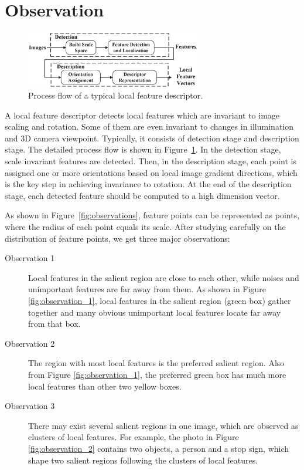 \section{Observation}
\label{sec:observation}

\begin{figure}
	\centering
	\includegraphics[width=3.0in]{images/fig-workflow.eps}
	\caption{Process flow of a typical local feature descriptor.}
	\label{fig:workflow}
\end{figure}

A local feature descriptor detects local features which are invariant to image scaling and rotation. Some of them are even invariant to changes in illumination and 3D camera viewpoint. Typically, it consists of detection stage and description stage. The detailed process flow is shown in Figure~\ref{fig:workflow}. In the detection stage, scale invariant features are detected. Then, in the description stage, each point is assigned one or more orientations based on local image gradient directions, which is the key step in achieving invariance to rotation. At the end of the description stage, each detected feature should be computed to a high dimension vector. 

As shown in Figure~\ref{fig:observations}, feature points can be represented as points, where the radius of each point equals its scale. After studying carefully on the distribution of feature points, we get three major observations:

\begin{description}
	
	\item[Observation 1]  Local features in the salient region are close to each other, while noises and unimportant features are far away from them. As shown in Figure \ref{fig:observation_1}, local features in the salient region (green box) gather together and many obvious unimportant local features locate far away from that box. 

	\item[Observation 2]  The region with most local features is the preferred salient region. Also from Figure \ref{fig:observation_1}, the preferred green box has much more local features than other two yellow boxes. 

	\item[Observation 3]  There may exist several salient regions in one image, which are observed as clusters of local features. For example, the photo in Figure \ref{fig:observation_2} contains two objects, a person and a stop sign, which shape two salient regions following the clusters of local features.

\end{description}

